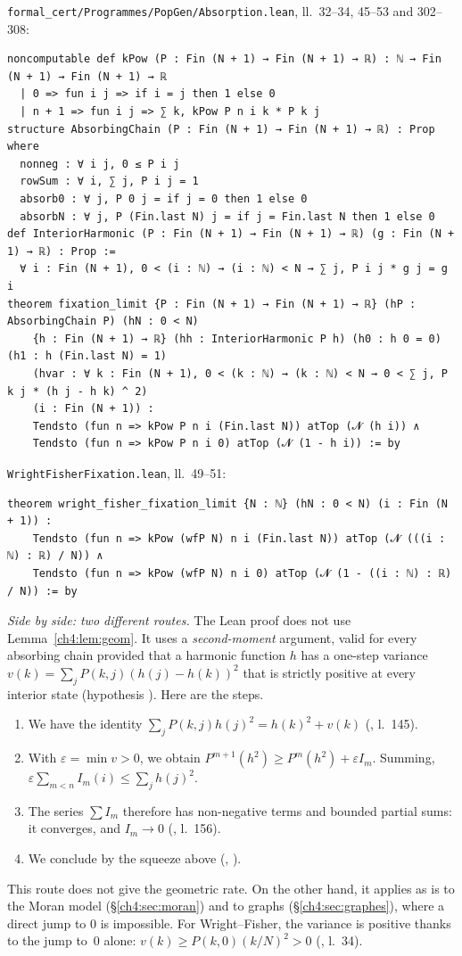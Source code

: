\begin{leanbox}
\texttt{formal\_cert/Programmes/PopGen/Absorption.lean}, ll.~32--34, 45--53 and 302--308:
\begin{lstlisting}[language=Lean]
noncomputable def kPow (P : Fin (N + 1) → Fin (N + 1) → ℝ) : ℕ → Fin (N + 1) → Fin (N + 1) → ℝ
  | 0 => fun i j => if i = j then 1 else 0
  | n + 1 => fun i j => ∑ k, kPow P n i k * P k j
structure AbsorbingChain (P : Fin (N + 1) → Fin (N + 1) → ℝ) : Prop where
  nonneg : ∀ i j, 0 ≤ P i j
  rowSum : ∀ i, ∑ j, P i j = 1
  absorb0 : ∀ j, P 0 j = if j = 0 then 1 else 0
  absorbN : ∀ j, P (Fin.last N) j = if j = Fin.last N then 1 else 0
def InteriorHarmonic (P : Fin (N + 1) → Fin (N + 1) → ℝ) (g : Fin (N + 1) → ℝ) : Prop :=
  ∀ i : Fin (N + 1), 0 < (i : ℕ) → (i : ℕ) < N → ∑ j, P i j * g j = g i
theorem fixation_limit {P : Fin (N + 1) → Fin (N + 1) → ℝ} (hP : AbsorbingChain P) (hN : 0 < N)
    {h : Fin (N + 1) → ℝ} (hh : InteriorHarmonic P h) (h0 : h 0 = 0) (h1 : h (Fin.last N) = 1)
    (hvar : ∀ k : Fin (N + 1), 0 < (k : ℕ) → (k : ℕ) < N → 0 < ∑ j, P k j * (h j - h k) ^ 2)
    (i : Fin (N + 1)) :
    Tendsto (fun n => kPow P n i (Fin.last N)) atTop (𝓝 (h i)) ∧
    Tendsto (fun n => kPow P n i 0) atTop (𝓝 (1 - h i)) := by
\end{lstlisting}
\texttt{WrightFisherFixation.lean}, ll.~49--51:
\begin{lstlisting}[language=Lean]
theorem wright_fisher_fixation_limit {N : ℕ} (hN : 0 < N) (i : Fin (N + 1)) :
    Tendsto (fun n => kPow (wfP N) n i (Fin.last N)) atTop (𝓝 (((i : ℕ) : ℝ) / N)) ∧
    Tendsto (fun n => kPow (wfP N) n i 0) atTop (𝓝 (1 - ((i : ℕ) : ℝ) / N)) := by
\end{lstlisting}
\emph{Side by side: two different routes.} The Lean proof does not use Lemma~\ref{ch4:lem:geom}. It
uses a \emph{second-moment} argument, valid for every absorbing chain provided that a harmonic
function $h$ has a one-step variance $v(k)=\sum_jP(k,j)(h(j)-h(k))^2$ that is strictly positive at every interior
state (hypothesis ). Here are the steps.
\begin{enumerate}[itemsep=1pt]
\item We have the identity $\sum_jP(k,j)h(j)^2=h(k)^2+v(k)$ (, l.~145).
\item With $\varepsilon=\min v>0$, we obtain $P^{m+1}(h^2)\ge P^m(h^2)+\varepsilon I_m$. Summing,
$\varepsilon\sum_{m<n}I_m(i)\le\sum_jh(j)^2$.
\item The series $\sum I_m$ therefore has non-negative terms and bounded partial sums: it converges, and
$I_m\to0$ (, l.~156).
\item We conclude by the squeeze above (, ).
\end{enumerate}
This route does not give the geometric rate. On the other hand, it applies as is to the Moran model
(§\ref{ch4:sec:moran}) and to graphs (§\ref{ch4:sec:graphes}), where a direct jump to $0$ is impossible. For
Wright--Fisher, the variance is positive thanks to the jump to~$0$ alone: $v(k)\ge P(k,0)(k/N)^2>0$
(, l.~34).
\end{leanbox}

